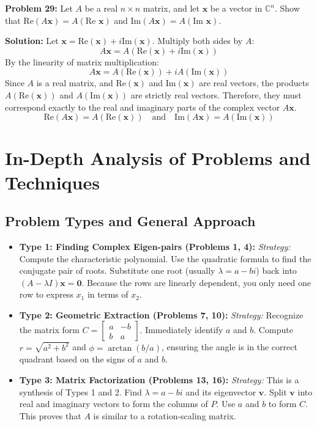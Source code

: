 \documentclass[11pt, letterpaper]{article}
\theoremstyle{definition}
\theoremstyle{remark}
\begin{document}
\vspace{1em}

\textbf{Problem 29:} Let $A$ be a real $n \times n$ matrix, and let $\mathbf{x}$ be a vector in $\mathbb{C}^n$. Show that $\text{Re}(A\mathbf{x}) = A(\text{Re }\mathbf{x})$ and $\text{Im}(A\mathbf{x}) = A(\text{Im }\mathbf{x})$.

\textbf{Solution:}
Let $\mathbf{x} = \text{Re}(\mathbf{x}) + i\text{Im}(\mathbf{x})$. 
Multiply both sides by $A$:
\[
A\mathbf{x} = A(\text{Re}(\mathbf{x}) + i\text{Im}(\mathbf{x}))
\]
By the linearity of matrix multiplication:
\[
A\mathbf{x} = A(\text{Re}(\mathbf{x})) + iA(\text{Im}(\mathbf{x}))
\]
Since $A$ is a real matrix, and $\text{Re}(\mathbf{x})$ and $\text{Im}(\mathbf{x})$ are real vectors, the products $A(\text{Re}(\mathbf{x}))$ and $A(\text{Im}(\mathbf{x}))$ are strictly real vectors. 
Therefore, they must correspond exactly to the real and imaginary parts of the complex vector $A\mathbf{x}$.
\[
\text{Re}(A\mathbf{x}) = A(\text{Re}(\mathbf{x})) \quad \text{and} \quad \text{Im}(A\mathbf{x}) = A(\text{Im}(\mathbf{x}))
\]

\newpage

\section{In-Depth Analysis of Problems and Techniques}

\subsection{Problem Types and General Approach}
\begin{itemize}
    \item \textbf{Type 1: Finding Complex Eigen-pairs (Problems 1, 4):} 
    \textit{Strategy:} Compute the characteristic polynomial. Use the quadratic formula to find the conjugate pair of roots. Substitute one root (usually $\lambda = a - bi$) back into $(A - \lambda I)\mathbf{x} = \mathbf{0}$. Because the rows are linearly dependent, you only need one row to express $x_1$ in terms of $x_2$.
    
    \item \textbf{Type 2: Geometric Extraction (Problems 7, 10):} 
    \textit{Strategy:} Recognize the matrix form $C = \begin{bmatrix} a & -b \\ b & a \end{bmatrix}$. Immediately identify $a$ and $b$. Compute $r = \sqrt{a^2 + b^2}$ and $\phi = \arctan(b/a)$, ensuring the angle is in the correct quadrant based on the signs of $a$ and $b$.
    
    \item \textbf{Type 3: Matrix Factorization (Problems 13, 16):} 
    \textit{Strategy:} This is a synthesis of Types 1 and 2. Find $\lambda = a - bi$ and its eigenvector $\mathbf{v}$. Split $\mathbf{v}$ into real and imaginary vectors to form the columns of $P$. Use $a$ and $b$ to form $C$. This proves that $A$ is similar to a rotation-scaling matrix.
\end{itemize}
\end{document}
